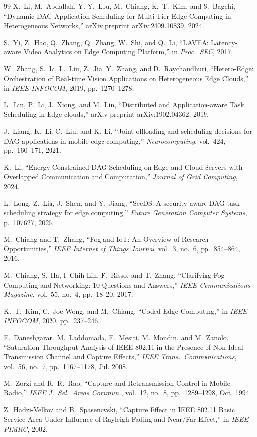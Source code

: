\documentclass[conference]{IEEEtran}
\begin{document}
\begin{thebibliography}{99}
X.~Li, M.~Abdallah, Y.-Y.~Lou, M.~Chiang, K.~T.~Kim, and S.~Bagchi,
``Dynamic {DAG}-Application Scheduling for Multi-Tier Edge Computing in
Heterogeneous Networks,''
arXiv preprint arXiv:2409.10839, 2024.

S.~Yi, Z.~Hao, Q.~Zhang, Q.~Zhang, W.~Shi, and Q.~Li,
``{LAVEA}: Latency-aware Video Analytics on Edge Computing Platform,''
in \emph{Proc.\ SEC}, 2017.

W.~Zhang, S.~Li, L.~Liu, Z.~Jia, Y.~Zhang, and D.~Raychaudhuri,
``Hetero-Edge: Orchestration of Real-time Vision Applications on
Heterogeneous Edge Clouds,''
in \emph{IEEE INFOCOM}, 2019, pp.~1270--1278.

L.~Lin, P.~Li, J.~Xiong, and M.~Lin,
``Distributed and Application-aware Task Scheduling in Edge-clouds,''
arXiv preprint arXiv:1902.04362, 2019.

J.~Liang, K.~Li, C.~Liu, and K.~Li,
``Joint offloading and scheduling decisions for {DAG} applications in
mobile edge computing,''
\emph{Neurocomputing},
vol.~424, pp.~160--171, 2021.

K.~Li,
``Energy-Constrained {DAG} Scheduling on Edge and Cloud Servers with
Overlapped Communication and Computation,''
\emph{Journal of Grid Computing}, 2024.

L.~Long, Z.~Liu, J.~Shen, and Y.~Jiang,
``{SecDS}: A security-aware {DAG} task scheduling strategy for edge
computing,''
\emph{Future Generation Computer Systems}, p.~107627, 2025.

M.~Chiang and T.~Zhang,
``Fog and {IoT}: An Overview of Research Opportunities,''
\emph{IEEE Internet of Things Journal},
vol.~3, no.~6, pp.~854--864, 2016.

M.~Chiang, S.~Ha, I~Chih-Lin, F.~Risso, and T.~Zhang,
``Clarifying Fog Computing and Networking: 10 Questions and Answers,''
\emph{IEEE Communications Magazine},
vol.~55, no.~4, pp.~18--20, 2017.

K.~T.~Kim, C.~Joe-Wong, and M.~Chiang,
``Coded Edge Computing,''
in \emph{IEEE INFOCOM}, 2020, pp.~237--246.

F.~Daneshgaran, M.~Laddomada, F.~Mesiti, M.~Mondin, and M.~Zanolo,
``Saturation Throughput Analysis of {IEEE} 802.11 in the Presence of Non
Ideal Transmission Channel and Capture Effects,''
\emph{IEEE Trans.\ Communications},
vol.~56, no.~7, pp.~1167--1178, Jul. 2008.

M.~Zorzi and R.~R.~Rao,
``Capture and Retransmission Control in Mobile Radio,''
\emph{IEEE J.\ Sel.\ Areas Commun.},
vol.~12, no.~8, pp.~1289--1298, Oct. 1994.

Z.~Hadzi-Velkov and B.~Spasenovski,
``Capture Effect in {IEEE} 802.11 Basic Service Area Under Influence of
{R}ayleigh Fading and Near/Far Effect,''
in \emph{IEEE PIMRC}, 2002.

\end{thebibliography}
\end{document}
